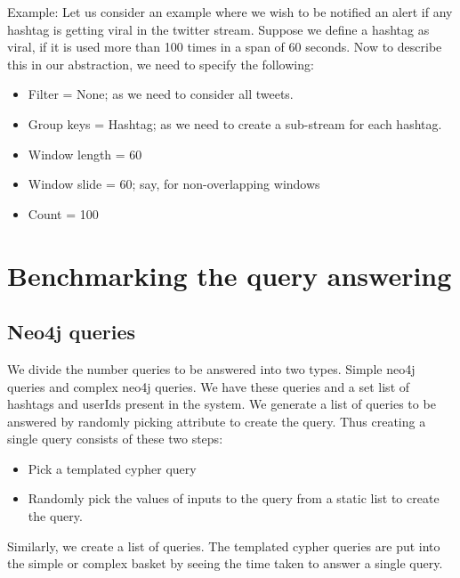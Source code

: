 \documentclass[letterpaper,10pt,english]{sphinxmanual}
\begin{document}
Example: Let us consider an example where we wish to be notified an alert if any hashtag is getting viral in the twitter stream. Suppose we define a hashtag as viral, if it is used more than 100 times in a span of 60 seconds. Now to describe this in our abstraction, we need to specify the following:
\begin{itemize}
\item {} 
Filter = None; as we need to consider all tweets.

\item {} 
Group keys = Hashtag; as we need to create a sub-stream for each hashtag.

\item {} 
Window length = 60

\item {} 
Window slide = 60; say, for non-overlapping windows

\item {} 
Count = 100

\end{itemize}


\chapter{Benchmarking the query answering}
\label{\detokenize{benchmarking:benchmarking-the-query-answering}}\label{\detokenize{benchmarking::doc}}

\section{Neo4j queries}
\label{\detokenize{benchmarking:neo4j-queries}}
We divide the number queries to be answered into two types. Simple  neo4j queries and complex neo4j queries. We have these queries and a set list of hashtags and userIds present in the system. We generate a list of queries to be answered by randomly picking attribute to create the query. Thus creating a single query consists of these two steps:
\begin{itemize}
\item {} 
Pick a templated cypher query

\item {} 
Randomly pick the values of inputs to the query from a static list to create the query.

\end{itemize}

Similarly, we create a list of queries. The templated cypher queries are put into the simple or complex basket by seeing the time taken to answer a single query.
\end{document}
